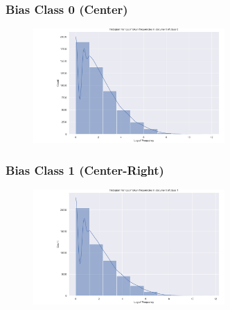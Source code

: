 \documentclass[11pt]{article}
\begin{document}
\pagebreak

\subsubsection{Bias Class 0 (Center)}
\begin{center}


\TTTFIDFTable
\begin{figure}[h!]
  \includegraphics[width=0.65\textwidth]{figs/words_histogram/hist_token_0.png}
\end{figure}
\end{center}

\pagebreak

\subsubsection{Bias Class 1 (Center-Right)}
\begin{center}


\TTTFIDFTable
\begin{figure}[h!]
  \includegraphics[width=0.65\textwidth]{figs/words_histogram/hist_token_1.png}
\end{figure}
\end{center}

\pagebreak
\end{document}
